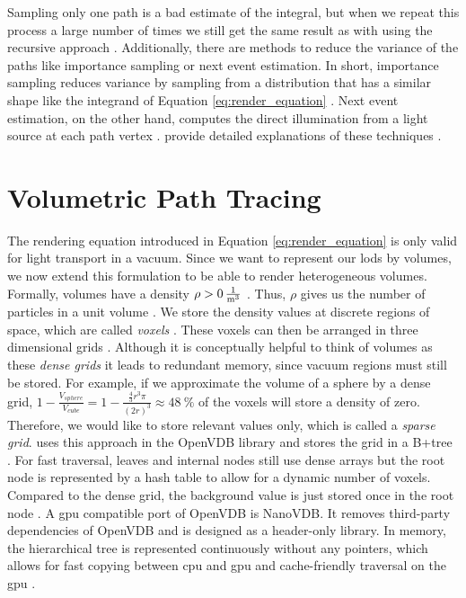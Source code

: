 Sampling only one path is a bad estimate of the integral, but when we repeat this process a large number of times we still get the same result as with using the recursive approach \cite{pbr}.
Additionally, there are methods to reduce the variance of the paths like importance sampling or next event estimation.
In short, importance sampling reduces variance by sampling from a distribution that has a similar shape like the integrand of Equation \ref{eq:render_equation} \cite{rendering_equation}.
Next event estimation, on the other hand, computes the direct illumination from a light source at each path vertex \cite{pbr}.
\citeauthor{pbr} provide detailed explanations of these techniques \cite{pbr}.

\section{Volumetric Path Tracing}
The rendering equation introduced in Equation \ref{eq:render_equation} is only valid for light transport in a vacuum.
Since we want to represent our \acsp{lod} by volumes, we now extend this formulation to be able to render heterogeneous volumes.
Formally, volumes have a density ${\rho > \SI{0}{\frac{1}{\m^3}}}$ \cite{pbr}.
Thus, $\rho$ gives us the number of particles in a unit volume \cite{novak_overview}.
We store the density values at discrete regions of space, which are called \textit{voxels} \cite{pbr}.
These voxels can then be arranged in three dimensional grids \cite{pbr}.
Although it is conceptually helpful to think of volumes as these \textit{dense grids} it leads to redundant memory, since vacuum regions must still be stored.
For example, if we approximate the volume of a sphere by a dense grid, $1 - \frac{V_{sphere}}{V_{cube}} = 1 - \frac{\frac{4}{3}r^3\pi}{(2r)^3}\approx \SI{48}{\%}$ of the voxels will store a density of zero.
Therefore, we would like to store relevant values only, which is called a \textit{sparse grid}.
\citeauthor{museth_vdb} uses this approach in the OpenVDB library and stores the grid in a B+tree \cite{museth_vdb}.
For fast traversal, leaves and internal nodes still use dense arrays but the root node is represented by a hash table to allow for a dynamic number of voxels.
Compared to the dense grid, the background value is just stored once in the root node \cite{museth_vdb}.
A \ac{gpu} compatible port of OpenVDB is NanoVDB.
It removes third-party dependencies of OpenVDB and is designed as a header-only library.
In memory, the hierarchical tree is represented continuously without any pointers, which allows for fast copying between \ac{cpu} and \ac{gpu} and cache-friendly traversal on the \ac{gpu} \cite{museth_nanovdb}.

